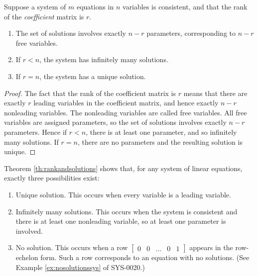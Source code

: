 \documentclass{ximera}
\begin{document}
\begin{theorem}\label{th:rankandsolutions}
Suppose a system of $m$ equations in $n$ variables is consistent, and that the rank of the {\it coefficient} matrix is $r$.

\begin{enumerate}
\item The set of solutions involves exactly $n - r$ parameters, corresponding to $n-r$ free variables.

\item If $r < n$, the system has infinitely many solutions.

\item If $r = n$, the system has a unique solution.

\end{enumerate}
\end{theorem}

\begin{proof}
The fact that the rank of the coefficient matrix is $r$ means that there are exactly $r$ leading variables in the coefficient matrix, and hence exactly $n - r$ nonleading variables. The nonleading variables are called free variables.  All free variables are assigned parameters, so the set of solutions involves exactly $n - r$ parameters. Hence if $r < n$, there is at least one parameter, and so infinitely many solutions. If $r = n$, there are no parameters and the resulting solution is unique.
\end{proof}

Theorem \ref{th:rankandsolutions} shows that, for any system of linear equations, exactly three possibilities exist:

\begin{enumerate}

\item Unique solution. This occurs when every variable is a leading variable.

\item Infinitely many solutions. This occurs when the system is consistent and there is at least one nonleading variable, so at least one parameter is involved.

\item No solution.  This occurs when a row $\left[\begin{array}{cccc|c}  0&0&\ldots &0&1
 \end{array}\right]$ appears in the row-echelon form. Such a row corresponds to an equation with no solutions. (See Example \ref{ex:nosolutionssys} of SYS-0020.)

\end{enumerate}
\end{document}
